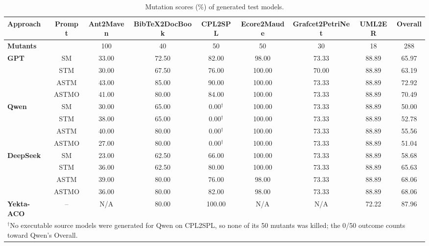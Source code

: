 \begin{table}[t]
\centering
\caption{Mutation scores (\%) of generated test models.}
\label{tab:rq2-suite-mutation-score}
\setlength{\tabcolsep}{3pt}
\begin{tabular}{lcccccccc}
\toprule
\textbf{Approach} & \textbf{Prompt} & \textbf{Ant2Maven} & \textbf{BibTeX2DocBook} & \textbf{CPL2SPL} & \textbf{Ecore2Maude} & \textbf{Grafcet2PetriNet} & \textbf{UML2ER} & \textbf{Overall}\\
\midrule
\textbf{Mutants} & & 100 & 40 & 50 & 50 & 30 & 18 & 288 \\
\midrule
\multirow{4}{*}{\textbf{GPT}}
  & SM & 33.00 & 72.50 & 82.00 & 98.00 & 73.33 & 88.89 & 65.97 \\
  & STM & 30.00 & 67.50 & 76.00 & 100.00 & 70.00 & 88.89 & 63.19 \\
  & ASTM & 43.00 & 85.00 & 90.00 & 100.00 & 73.33 & 88.89 & 72.92 \\
  & ASTMO & 41.00 & 80.00 & 84.00 & 100.00 & 73.33 & 88.89 & 70.49 \\
\midrule
\multirow{4}{*}{\textbf{Qwen}}
  & SM & 30.00 & 65.00 & 0.00$^{\dagger}$ & 100.00 & 73.33 & 88.89 & 50.00 \\
  & STM & 38.00 & 65.00 & 0.00$^{\dagger}$ & 100.00 & 73.33 & 88.89 & 52.78 \\
  & ASTM & 40.00 & 80.00 & 0.00$^{\dagger}$ & 100.00 & 73.33 & 88.89 & 55.56 \\
  & ASTMO & 27.00 & 80.00 & 0.00$^{\dagger}$ & 100.00 & 73.33 & 88.89 & 51.04 \\
\midrule
\multirow{4}{*}{\textbf{DeepSeek}}
  & SM & 23.00 & 62.50 & 66.00 & 100.00 & 73.33 & 88.89 & 58.68 \\
  & STM & 36.00 & 62.50 & 80.00 & 100.00 & 73.33 & 88.89 & 65.63 \\
  & ASTM & 39.00 & 80.00 & 76.00 & 98.00 & 73.33 & 88.89 & 68.06 \\
  & ASTMO & 36.00 & 80.00 & 82.00 & 98.00 & 73.33 & 88.89 & 68.06 \\
\textbf{Yekta-ACO} & -- & N/A & 80.00 & 100.00 & N/A & N/A & 72.22 & 87.96 \\
\bottomrule
\multicolumn{9}{p{0.98\linewidth}}{\footnotesize $^{\dagger}$No executable source models were generated for Qwen on CPL2SPL, so none of its 50 mutants was killed; the 0/50 outcome counts toward Qwen's Overall.}
\end{tabular}
\end{table}
